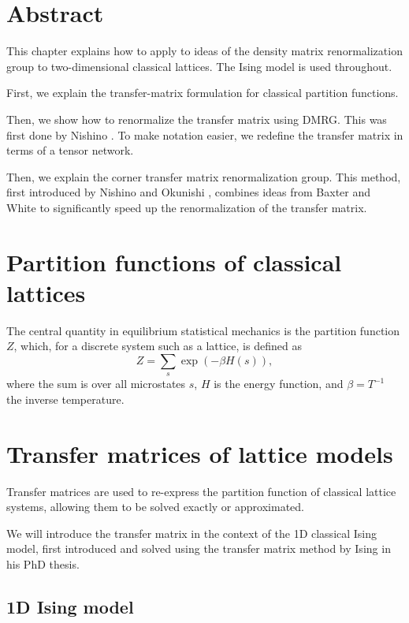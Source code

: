 \section{Abstract}
This chapter explains how to apply to ideas of the density matrix renormalization group to
two-dimensional classical lattices. The Ising model is used throughout.

First, we explain the transfer-matrix formulation for
classical partition functions.

Then, we show how to renormalize the transfer matrix using DMRG. This was first done by
Nishino \cite{nishino1995density}. To make notation easier, we redefine the transfer
matrix in terms of a tensor network.

Then, we explain the
corner transfer matrix renormalization group. This method, first introduced by Nishino and
Okunishi \cite{nishino1996corner}, combines ideas from Baxter \cite{baxter1968dimers,
baxter1978variational, baxter1982exactly} and White \cite{white1992density} to
significantly speed up the renormalization of the transfer matrix.

\section{Partition functions of classical lattices}
The central quantity in equilibrium statistical mechanics is the partition
function $Z$, which, for a discrete system such as a lattice, is defined as
\begin{equation}
  Z = \sum_{s} \exp{(-\beta H(s))},
\end{equation}
where the sum is over all microstates $s$, $H$ is the energy function, and
$\beta = T^{-1}$ the inverse temperature.

\section{Transfer matrices of lattice models}

Transfer matrices are used to re-express the partition function of classical
lattice systems, allowing them to be solved exactly or approximated.

We will introduce the transfer matrix in the context of the 1D classical
Ising model, first introduced and solved using the transfer matrix method by Ising
\cite{ising1925beitrag} in his PhD thesis.

\subsection{1D Ising model}

